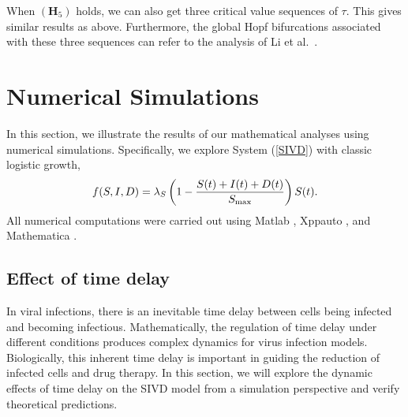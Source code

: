 \documentclass{CMHPhD-SIVD}
\begin{document}
When $(\mathbf{H}_5)$ holds, we can also get three critical value sequences of $\tau$. This gives similar results as above. Furthermore, the global Hopf bifurcations associated with these three sequences can refer to the analysis of Li et al.\ \cite{li2012global}.



\section{Numerical Simulations}\label{sec4}
In this section, we illustrate the results of our mathematical analyses using numerical simulations.
Specifically,  we explore System (\ref{SIVD}) with classic logistic growth,
$$f(S, I, D) = \lambda_S\left(1-\frac{S(t)+I(t)+D(t)}{S_{\text{max}}}\right)S(t).$$ 
All numerical computations were carried out using Matlab \cite{shampine2001solving}, Xppauto \cite{ermentrout2002animating,ermentrout2003simulating}, and Mathematica \cite{wellin2005introduction,hazrat2010mathematica}.


\subsection{Effect of time delay}
In viral infections, there is an inevitable time delay between cells being infected and becoming infectious. Mathematically, the regulation of time delay under different conditions produces complex dynamics for virus infection models. Biologically, this inherent time delay is important in guiding the reduction of infected cells and drug therapy. In this section, we will explore the dynamic effects of time delay on the SIVD model from a simulation perspective and verify theoretical predictions.
\end{document}
